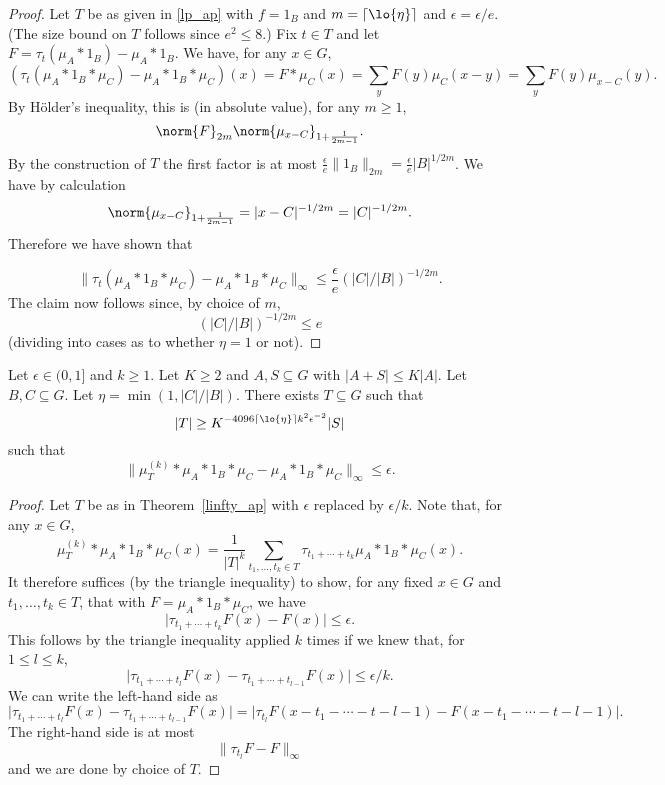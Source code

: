 \begin{proof}
\leanok
{} Let $T$ be as given in \ref{lp_ap}
with $f=1_B$ and $m=\lceil \lo{\eta}\rceil$ and $\epsilon=\epsilon/e$. (The size bound on $T$ follows since $e^2\leq 8$.) Fix $t\in T$ and let $F=\tau_t(\mu_A\ast 1_B)-\mu_A\ast 1_B$. We have, for any $x\in G$,
\[(\tau_t(\mu_A\ast 1_B\ast \mu_C)-\mu_A\ast 1_B\ast \mu_C)(x)=F\ast \mu_C(x)=\sum_y F(y)\mu_{C}(x-y)=\sum_yF(y)\mu_{x-C}(y).\]
By Hölder's inequality, this is (in absolute value), for any $m\geq 1$,
\[\norm{F}_{2m}\norm{\mu_{x-C}}_{1+\frac{1}{2m-1}}.\]
By the construction of $T$ the first factor is at most
$\frac{\epsilon}{e}\| 1_B\|_{2m}=\frac{\epsilon}{e}\lvert B\rvert^{1/2m}$.
We have by calculation
\[\norm{\mu_{x-C}}_{1+\frac{1}{2m-1}}=\lvert x-C\rvert^{-1/2m}=\lvert C\rvert^{-1/2m}.\]
Therefore we have shown that

\[\| \tau_t(\mu_A\ast 1_B\ast \mu_C)-\mu_A\ast 1_B\ast \mu_C\|_{\infty}\leq \frac{\epsilon}{e}(\lvert C\rvert/\lvert B\rvert)^{-1/2m}.\]
The claim now follows since, by choice of $m$,
\[(\lvert C\rvert/\lvert B\rvert)^{-1/2m}\leq e\]
(dividing into cases as to whether $\eta=1$ or not).
\end{proof}


\begin{theorem}
\label{linfty_ap_boosted}
\leanok
Let $\epsilon\in (0,1]$ and $k\geq 1$. Let $K\geq 2$ and $A,S\subseteq G$ with $\lvert A+S\rvert\leq K\lvert A\rvert$.
Let $B,C\subseteq G$. Let $\eta=\min(1,\lvert C\rvert/\lvert B\rvert)$. There exists $T\subseteq G$ such that
\[\lvert T\rvert \geq K^{-4096\lceil \lo{\eta}\rceil k^2\epsilon^{-2}}\lvert S\rvert\]
such that
\[\| \mu_T^{(k)}\ast \mu_A\ast 1_B\ast \mu_C-\mu_A\ast 1_B\ast \mu_C\|_{\infty}\leq \epsilon.\]
\end{theorem}

\begin{proof}
\leanok
Let $T$ be as in Theorem~\ref{linfty_ap} with $\epsilon$ replaced by $\epsilon/k$. Note that, for any $x\in G$,
\[\mu_T^{(k)}\ast \mu_A\ast 1_B\ast \mu_C(x)=\frac{1}{\lvert T\rvert^k}\sum_{t_1,\ldots,t_k\in T}\tau_{t_1+\cdots+t_k}\mu_A\ast 1_B\ast \mu_C(x).\]
It therefore suffices (by the triangle inequality) to show, for any fixed $x\in G$ and $t_1,\ldots,t_k\in T$, that with $F=\mu_A\ast 1_B\ast \mu_C$, we have
\[\lvert \tau_{t_1+\cdots+t_k}F(x)-F(x)\rvert \leq \epsilon.\]
This follows by the triangle inequality applied $k$ times if we knew that, for $1\leq l\leq k$,
\[\lvert \tau_{t_1+\cdots+t_l}F(x)-\tau_{t_1+\cdots+t_{l-1}}F(x)\rvert \leq \epsilon/k.\]
We can write the left-hand side as
\[\lvert \tau_{t_1+\cdots+t_l}F(x)-\tau_{t_1+\cdots+t_{l-1}}F(x)\rvert=\lvert \tau_{t_l}F(x-t_1-\cdots-t-{l-1})-F(x-t_1-\cdots-t-{l-1})\rvert.\]
The right-hand side is at most
\[\| \tau_{t_l}F-F\|_\infty\]
and we are done by choice of $T$.
\end{proof}
